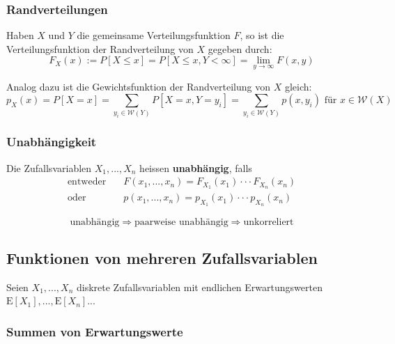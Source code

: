\documentclass[11pt]{article}
\newcommand{\E}{\text{E}}
\begin{document}
\subsubsection{Randverteilungen}

Haben $X$ und $Y$ die gemeinsame Verteilungsfunktion $F$, so ist die Verteilungsfunktion der Randverteilung von $X$ gegeben durch:
\begin{equation*}
	F_X(x) := P[X \leq x] = P[X \leq x, Y < \infty] = \lim_{y \rightarrow \infty} F(x,y)
\end{equation*}

Analog dazu ist die Gewichtsfunktion der Randverteilung von $X$ gleich:
\begin{equation*}
	p_X(x) = P[X = x] = \sum_{y_i \in \mathcal{W}(Y)} P[X=x, Y=y_i] = \sum_{y_i \in \mathcal{W}(Y)} p(x, y_i) \text{ f{\"u}r } x \in \mathcal{W}(X)
\end{equation*}

\subsubsection{Unabh{\"a}ngigkeit}

Die Zufallsvariablen $X_1,...,X_n$ heissen \textbf{unabh{\"a}ngig}, falls
\begin{equation*}
\begin{split}
		\text{entweder} \quad & F(x_1,...,x_n) = F_{X_1}(x_1) \cdot\cdot\cdot F_{X_n}(x_n)  \\
		\text{oder} \quad & p(x_1,...,x_n) = p_{X_1}(x_1) \cdot\cdot\cdot p_{X_n}(x_n)
\end{split}
\end{equation*}

\begin{equation*}
	\text{unabh{\"a}ngig} \Rightarrow \text{paarweise unabh{\"a}ngig} \Rightarrow \text{unkorreliert}
\end{equation*}

\subsection{Funktionen von mehreren Zufallsvariablen}

Seien $X_1,...,X_n$ diskrete Zufallsvariablen mit endlichen Erwartungswerten $\E[X_1],...,\E[X_n]$...

\subsubsection{Summen von Erwartungswerte}
\end{document}
